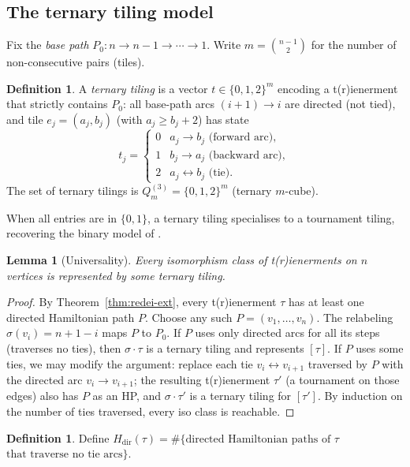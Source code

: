 \documentclass[12pt,reqno]{amsart}
\newtheorem{lemma}[theorem]{Lemma}
\theoremstyle{definition}
\newtheorem{definition}[theorem]{Definition}
\theoremstyle{plain}
\begin{document}
\subsection{The ternary tiling model}
\label{ssec:ternary-tiling}

Fix the \emph{base path} $P_0: n\to n{-}1\to\cdots\to 1$.
Write $m=\binom{n-1}{2}$ for the number of non-consecutive pairs (tiles).

\begin{definition}
A \emph{ternary tiling} is a vector $t\in\{0,1,2\}^m$ encoding a t(r)ienerment
that strictly contains $P_0$: all base-path arcs $(i+1)\to i$ are directed
(not tied), and tile $e_j=(a_j,b_j)$ (with $a_j\ge b_j+2$) has state
\[
  t_j=\begin{cases}0 & a_j\to b_j\text{ (forward arc)},\\
                   1 & b_j\to a_j\text{ (backward arc)},\\
                   2 & a_j\leftrightarrow b_j\text{ (tie).}\end{cases}
\]
The set of ternary tilings is $Q_m^{(3)}=\{0,1,2\}^m$ (ternary $m$-cube).
\end{definition}

When all entries are in $\{0,1\}$, a ternary tiling specialises to a tournament
tiling, recovering the binary model of \cite{Cassidy2026}.

\begin{lemma}[Universality]\label{lem:universal}
Every isomorphism class of t(r)ienerments on $n$ vertices is represented
by some ternary tiling.
\end{lemma}

\begin{proof}
By Theorem~\ref{thm:redei-ext}, every t(r)ienerment $\tau$ has at least one
directed Hamiltonian path $P$.  Choose any such $P=(v_1,\ldots,v_n)$.
The relabeling $\sigma(v_i)=n+1-i$ maps $P$ to $P_0$.  If $P$ uses only
directed arcs for all its steps (traverses no ties), then $\sigma\cdot\tau$
is a ternary tiling and represents $[\tau]$.  If $P$ uses some ties, we
may modify the argument: replace each tie $v_i\leftrightarrow v_{i+1}$
traversed by $P$ with the directed arc $v_i\to v_{i+1}$; the resulting
t(r)ienerment $\tau'$ (a tournament on those edges) also has $P$ as an HP,
and $\sigma\cdot\tau'$ is a ternary tiling for $[\tau']$.  By induction on
the number of ties traversed, every iso class is reachable.
\end{proof}

\begin{definition}
Define $H_{\mathrm{dir}}(\tau)=\#\{\text{directed Hamiltonian paths of }\tau$
$\text{that traverse no tie arcs}\}$.
\end{definition}
\end{document}
